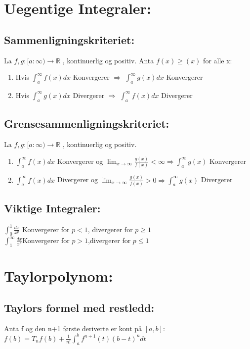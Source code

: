\documentclass[8pt,a4paper,twocolumn,twoside]{article}
\begin{document}
    \section*{Uegentige Integraler:}
        \subsection*{Sammenligningskriteriet:}
        La $f,g : [a:\infty)\rightarrow \mathbb{R}$ , kontinuerlig og positiv. Anta
        $f(x)\geq(x)$ for alle x:
        \begin{enumerate}[topsep = 0pt,partopsep = 0pt, itemsep = 0cm]
            \item Hvis $\int_a^\infty f(x) dx$ Konvergerer $\Rightarrow$ $\int_a^\infty g(x) dx$ Konvergerer
            \item Hvis $\int_a^\infty g(x) dx$ Divergerer $\Rightarrow$ $\int_a^\infty f(x) dx$ Divergerer
        \end{enumerate}
        \subsection*{Grensesammenligningskriteriet:}
        La $f,g : [a:\infty)\rightarrow \mathbb{R}$ , kontinuerlig og positiv.
        \begin{enumerate}[topsep = 0pt,partopsep = 0pt, itemsep = 0cm]
            \item $\int_a^\infty f(x)dx$ Konvergerer og $\lim_{x\to\infty}\frac{g(x)}{f(x)}<\infty \Rightarrow \int_a^\infty g(x)$ Konvergerer 
            \item $\int_a^\infty f(x)dx$ Divergerer og $\lim_{x\to\infty}\frac{g(x)}{f(x)}>0 \Rightarrow \int_a^\infty g(x)$ Divergerer
        \end{enumerate}
        \subsection*{Viktige Integraler:}
        $\int_0^1 \frac{dx}{x^p}$ Konvergerer for $p<1$, divergerer for $p\geq1$\\
        $\int_1^\infty\frac{dx}{x^p}$Konvergerer for $p>1$,divergerer for $p\leq1$\\
    
    \section*{Taylorpolynom:}
        \subsection*{Taylors formel med restledd:}
        Anta f og den n+1 første deriverte er kont på $[a,b]$:\\
        $f(b) = T_n f(b)+\frac{1}{n!}\int_a^b f^{n+1}(t)(b-t)^n dt$
\end{document}
